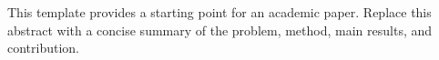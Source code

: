 \begin{compactabstract}
This template provides a starting point for an academic paper. Replace this
abstract with a concise summary of the problem, method, main results, and
contribution.
\end{compactabstract}
